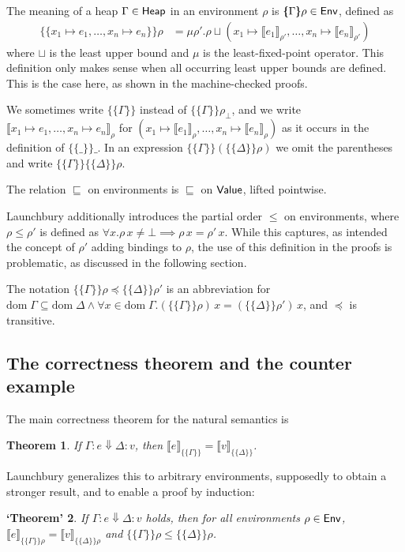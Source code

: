 \documentclass{jfp1}
\newtheorem{theorem}{Theorem}
\newtheorem{falsetheorem}[theorem]{‘Theorem’}
\theoremstyle{nonumberbreak}
\newcommand{\sHeap} {\text{\textsf{Heap}}}
\newcommand{\sValue}{\text{\textsf{Value}}}
\newcommand{\sEnv}  {\text{\textsf{Env}}}
\newcommand{\sred}[4]{#1 : #2 \Downarrow #3 : #4}
\newcommand{\dom}[1]{\text{dom}\;#1}
\newcommand{\xen}{x_1\mapsto e_1, \ldots, x_n\mapsto e_n}
\newcommand{\dsem}[2]{\llbracket #1 \rrbracket_{#2}}
\newcommand{\esem}[1]{\{\!\!\!\{#1\}\!\!\!\}}
\begin{document}
The meaning of a heap $\Gamma \in \sHeap$ in an environment $\rho$ is $\esem \Gamma \rho \in \sEnv$, defined as
\begin{align*}
\esem{ \xen}\rho 
&= \mu \rho'. \rho \sqcup (x_1 \mapsto \dsem{e_1}{\rho'}, \ldots, x_n \mapsto \dsem{e_n}{\rho'})
\end{align*}
where $\sqcup$ is the least upper bound and $\mu$ is the least-fixed-point operator. This definition only makes sense when all occurring least upper bounds are defined. This is the case here, as shown in the machine-checked proofs.

We sometimes write $\esem{\Gamma}$ instead of $\esem{\Gamma}{\rho_\bot}$, and we write $\dsem{\xen}\rho$ for $(x_1\mapsto \dsem{e_1}\rho,\ldots,x_n\mapsto \dsem{e_n}\rho)$ as it occurs in the definition of $\esem{\_}\_$. In an expression $\esem{\Gamma}(\esem{\Delta}\rho)$ we omit the parentheses and write $\esem{\Gamma}\esem{\Delta}\rho$.

The relation $\sqsubseteq$ on environments is $\sqsubseteq$ on $\sValue$, lifted pointwise.

Launchbury additionally introduces the partial order $\le$ on environments, where $\rho \le \rho'$ is defined as $\forall x. \rho\, x \ne \bot \implies \rho\,x =\rho'\,x$. While this captures, as intended the concept of $\rho'$ adding bindings to $\rho$, the use of this definition in the proofs is problematic, as discussed in the following section.

The notation $\esem{\Gamma}\rho \preceq \esem{\Delta}{\rho'}$ is an abbreviation for $\dom\Gamma \subseteq \dom\Delta \wedge \forall x\in \dom\Gamma. (\esem{\Gamma}\rho)\,x = (\esem{\Delta}{\rho'})\,x$, and $\preceq$ is transitive.


\subsection{The correctness theorem and the counter example}
\label{counterexample}

The main correctness theorem for the natural semantics is
\begin{theorem}
If $\sred \Gamma e \Delta v$, then $\dsem{e}{\esem{\Gamma}} = \dsem{v}{\esem{\Delta}}$.
\label{thm:main}
\end{theorem}

Launchbury generalizes this to arbitrary environments, supposedly to obtain a stronger result, and to enable a proof by induction:

\begin{falsetheorem}
If $\sred \Gamma e \Delta v$ holds, then for all environments $\rho \in \sEnv$, $\dsem{e}{\esem{\Gamma}{\rho}} = \dsem{v}{\esem{\Delta}{\rho}}$ and $\esem\Gamma\rho \le \esem\Delta\rho$.%
\label{thm:false}
\end{falsetheorem}
\end{document}
